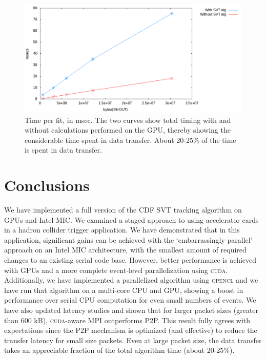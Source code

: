 \documentclass[journal]{IEEEtran}
\begin{document}
\begin{figure}[!t]
  \centering
  \includegraphics[width=0.85\linewidth]{figures/cudaware}
  \caption{Time per fit, in msec. The two curves show total timing
    with and without calculations performed on the GPU, thereby
    showing the considerable time spent in data transfer. About
    20-25\% of the time is spent in data transfer.}
  \label{fig:transferOnly}
\end{figure}



\section{Conclusions}
We have implemented a full version of the CDF SVT tracking algorithm
on GPUs and Intel MIC. We examined a staged approach to using
accelerator cards in a hadron collider trigger application. We have
demonstrated that in this application, significant gains can be
achieved with the `embarrassingly parallel' approach on an Intel MIC
architecture, with the smallest amount of required changes to an
existing serial code base. However, better performance is achieved
with GPUs and a more complete event-level parallelization using
\textsc{cuda}.  Additionally, we have implemented a parallelized algorithm using 
\textsc{opencl} and we have run that algorithm on a multi-core CPU and GPU, showing a boost
in performance over serial CPU computation for even small numbers of events. 
We have also updated latency studies and shown that for larger packet sizes 
(greater than 600 kB), \textsc{cuda}-aware MPI outperforms P2P. This result fully agrees with expectations 
since the P2P mechanism is optimized (and effective) to reduce the transfer latency for 
small size packets.
Even at large packet
size, the data transfer takes an appreciable fraction of the total
algorithm time (about 20-25\%).
\end{document}
